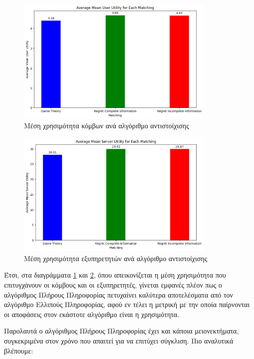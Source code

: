 \begin{figure}[H]
    \centering
    \includegraphics[width=0.85\textwidth]{figures/chapter4/Average_Mean_User_Utility.png}
    \caption{Μέση χρησιμότητα κόμβων ανά αλγόριθμο αντιστοίχισης}
    \label{fig27}
\end{figure}

\begin{figure}[H]
    \centering
    \includegraphics[width=0.85\textwidth]{figures/chapter4/Average_Mean_Server_Utility.png}
    \caption{Μέση χρησιμότητα εξυπηρετητών ανά αλγόριθμο αντιστοίχισης}
    \label{fig28}
\end{figure}

Έτσι, στα διαγράμματα \ref{fig27} και \ref{fig28}, όπου απεικονίζεται η μέση χρησιμότητα που επιτυγχάνουν οι κόμβους και οι εξυπηρετητές, γίνεται εμφανές πλέον πως ο αλγόριθμος Πλήρους Πληροφορίας πετυχαίνει καλύτερα αποτελέσματα από τον αλγόριθμο Ελλιπούς Πληροφορίας, αφού εν τέλει η μετρική με την οποία παίρνονται οι αποφάσεις στον εκάστοτε αλγόριθμο είναι η χρησιμότητα. 

Παρολαυτά ο αλγόριθμος Πλήρους Πληροφορίας έχει και κάποια μειονεκτήματα, συγκεκριμένα στον χρόνο που απαιτεί για να επιτύχει σύγκλιση. Πιο αναλυτικά βλέπουμε:

